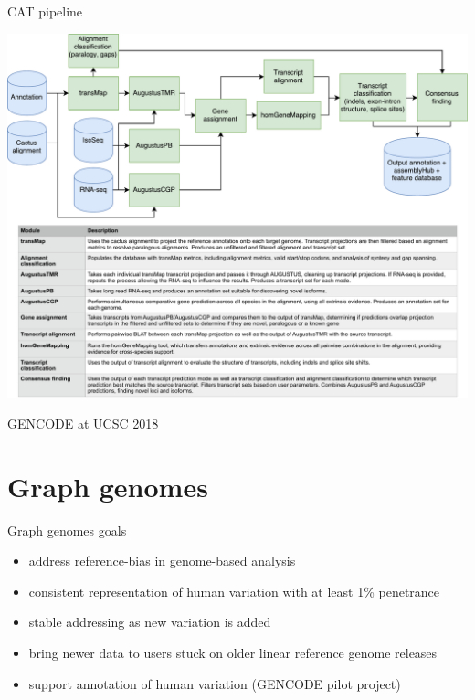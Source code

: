 \documentclass[10pt,
               hyperref={bookmarks=false,
                         bookmarksopen=false,
                         colorlinks=true,
                         linkcolor=blue,
                         urlcolor=blue},
               xcolor={svgnames,table}]{beamer}
\newcommand{\sectionframe}[1]{
  \begin{frame}{\thetitle}
    \section{#1}
  \end{frame}
}
\newcommand{\thetitle}{GENCODE at UCSC 2018}
\begin{document}
\begin{frame}{CAT pipeline}
  \begin{center}
    \includegraphics[scale=0.38]{images/CAT_pipeline.pdf}
  \end{center}
\end{frame}

\sectionframe{Graph genomes}

\begin{frame}{Graph genomes goals}
  \begin{itemize}
  \item address reference-bias in genome-based analysis
  \item consistent representation of human variation with at least 1\% penetrance
  \item stable addressing as new variation is added
  \item bring newer data to users stuck on older linear reference genome releases
  \item support annotation of human variation (GENCODE pilot project)
  \end{itemize}
\end{frame}
\end{document}
